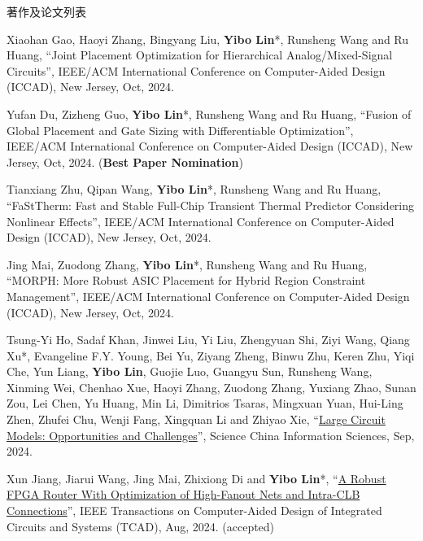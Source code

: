 \begin{rSection}{著作及论文列表}
\begin{description}[font=\normalfont, rightmargin=2em]
{}
            

\item[{[C162]}]{
        Xiaohan Gao, Haoyi Zhang, Bingyang Liu, \textbf{Yibo Lin}*, Runsheng Wang and Ru Huang, 
    ``Joint Placement Optimization for Hierarchical Analog/Mixed-Signal Circuits'', 
    IEEE/ACM International Conference on Computer-Aided Design (ICCAD), New Jersey, Oct, 2024.
    
}
            

\item[{[C161]}]{
        Yufan Du, Zizheng Guo, \textbf{Yibo Lin}*, Runsheng Wang and Ru Huang, 
    ``Fusion of Global Placement and Gate Sizing with Differentiable Optimization'', 
    IEEE/ACM International Conference on Computer-Aided Design (ICCAD), New Jersey, Oct, 2024.
    (\textbf{Best Paper Nomination})
}
            

\item[{[C160]}]{
        Tianxiang Zhu, Qipan Wang, \textbf{Yibo Lin}*, Runsheng Wang and Ru Huang, 
    ``FaStTherm: Fast and Stable Full-Chip Transient Thermal Predictor Considering Nonlinear Effects'', 
    IEEE/ACM International Conference on Computer-Aided Design (ICCAD), New Jersey, Oct, 2024.
    
}
            

\item[{[C159]}]{
        Jing Mai, Zuodong Zhang, \textbf{Yibo Lin}*, Runsheng Wang and Ru Huang, 
    ``MORPH: More Robust ASIC Placement for Hybrid Region Constraint Management'', 
    IEEE/ACM International Conference on Computer-Aided Design (ICCAD), New Jersey, Oct, 2024.
    
}
            

\item[{[J158]}]{
        Tsung-Yi Ho, Sadaf Khan, Jinwei Liu, Yi Liu, Zhengyuan Shi, Ziyi Wang, Qiang Xu*, Evangeline F.Y. Young, Bei Yu, Ziyang Zheng, Binwu Zhu, Keren Zhu, Yiqi Che, Yun Liang, \textbf{Yibo Lin}, Guojie Luo, Guangyu Sun, Runsheng Wang, Xinming Wei, Chenhao Xue, Haoyi Zhang, Zuodong Zhang, Yuxiang Zhao, Sunan Zou, Lei Chen, Yu Huang, Min Li, Dimitrios Tsaras, Mingxuan Yuan, Hui-Ling Zhen, Zhufei Chu, Wenji Fang, Xingquan Li and Zhiyao Xie, 
    ``\href{https://doi.org/10.1007/s11432-024-4155-7}{Large Circuit Models: Opportunities and Challenges}'', 
    Science China Information Sciences, Sep, 2024.
    
}
            

\item[{[J157]}]{
        Xun Jiang, Jiarui Wang, Jing Mai, Zhixiong Di and \textbf{Yibo Lin}*, 
    ``\href{https://doi.org/10.1109/TCAD.2024.3447218}{A Robust FPGA Router With Optimization of High-Fanout Nets and Intra-CLB Connections}'', 
    IEEE Transactions on Computer-Aided Design of Integrated Circuits and Systems (TCAD), Aug, 2024.
    (accepted)
}
            


\end{description}
\end{rSection}
